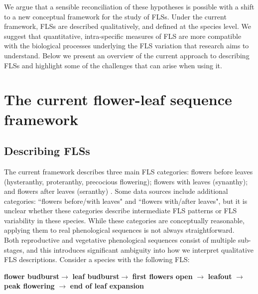 \documentclass[11pt]{article}
\begin{document}
\noindent We argue that a sensible reconciliation of these hypotheses is possible with a shift to a new conceptual framework for the study of FLSs. Under the current framework, FLSs are described qualitatively, and defined at the species level. We suggest that quantitative, intra-specific measures of FLS are more compatible with the biological processes underlying the FLS variation that research aims to understand. Below we present an overview of the current approach to describing FLSs and highlight some of the challenges that can arise when using it. \\

\section*{The current flower-leaf sequence framework}
\subsection*{Describing FLSs}
\noindent  The current framework describes three main FLS categories: flowers before leaves (hysteranthy, proteranthy, precocious flowering); flowers with leaves (synanthy); and flowers after leaves (seranthy) \citep{Lamont2011, Heinig1899}. Some data sources \citep[e.g.][]{Burns1990,Barnes2004} include additional categories: ``flowers before/with leaves" and ``flowers with/after leaves", but it is unclear whether these categories describe intermediate FLS patterns or FLS variability in these species. While these categories are conceptually reasonable, applying them to real phenological sequences is not always straightforward.\\

\noindent Both reproductive and vegetative phenological sequences consist of multiple sub-stages, and this introduces significant ambiguity into how we interpret qualitative FLS descriptions. Consider a species with the following FLS:\\

\begin{center}
\textbf{flower budburst}$\rightarrow$ \textbf{leaf budburst}$\rightarrow$ \textbf{first flowers open} $\rightarrow$ \textbf{leafout} $\rightarrow$ \textbf{peak flowering} $\rightarrow$ \textbf{end of leaf expansion} \\
\end{center}
\end{document}
